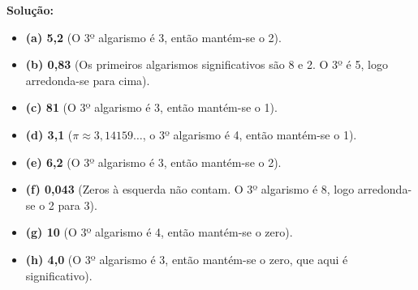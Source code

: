 \textbf{Solução:}

\begin{itemize}
    \item \textbf{(a) 5,2} (O 3º algarismo é 3, então mantém-se o 2).
    \item \textbf{(b) 0,83} (Os primeiros algarismos significativos são 8 e 2. O 3º é 5, logo arredonda-se para cima).
    \item \textbf{(c) 81} (O 3º algarismo é 3, então mantém-se o 1).
    \item \textbf{(d) 3,1} ($\pi \approx 3{,}14159\ldots$, o 3º algarismo é 4, então mantém-se o 1).
    \item \textbf{(e) 6,2} (O 3º algarismo é 3, então mantém-se o 2).
    \item \textbf{(f) 0,043} (Zeros à esquerda não contam. O 3º algarismo é 8, logo arredonda-se o 2 para 3).
    \item \textbf{(g) 10} (O 3º algarismo é 4, então mantém-se o zero).
    \item \textbf{(h) 4,0} (O 3º algarismo é 3, então mantém-se o zero, que aqui é significativo).
\end{itemize}
